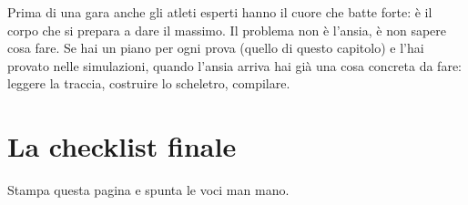 \begin{analogia}
Prima di una gara anche gli atleti esperti hanno il cuore che batte forte: è il corpo
che si prepara a dare il massimo. Il problema non è l'ansia, è non sapere cosa fare. Se
hai un piano per ogni prova (quello di questo capitolo) e l'hai provato nelle
simulazioni, quando l'ansia arriva hai già una cosa concreta da fare: leggere la
traccia, costruire lo scheletro, compilare.
\end{analogia}

\clearpage
\section{La checklist finale}

Stampa questa pagina e spunta le voci man mano.

